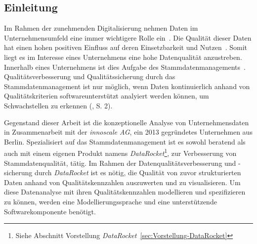\documentclass[
  language=german, %
  type=bachelor,%
  ngerman
]{isthesis}
\begin{document}
\begin{content}



  \chapter{Einleitung}


	Im Rahmen der zunehmenden Digitalisierung nehmen Daten im Unternehmensumfeld
	eine immer wichtigere Rolle ein~\cite[][]{otto2016datenqualitat}. Die
	Qualität dieser Daten hat einen hohen positiven Einfluss auf deren
	Einsetzbarkeit und Nutzen~\cite[][]{naumann2007datenqualitat,
	helfert2000massnahmen}. Somit liegt es im Interesse eines Unternehmens eine
	hohe Datenqualität anzustreben. Innerhalb eines Unternehmens ist dies Aufgabe
	des Stammdatenmanagements~\cite[][]{legner2007stammdaten}.
	Qualitätsverbesserung und Qualitätssicherung durch das Stammdatenmanagement
	ist nur möglich, wenn Daten kontinuierlich anhand von Qualitätskriterien
	softwareunterstützt analyiert werden können, um Schwachstellen zu erkennen
	(\cite{baghi2013controlling}, S. 2).

  Gegenstand dieser Arbeit ist die konzeptionelle Analyse von Unternehmensdaten
  in Zusammenarbeit mit der \textit{innoscale AG}, ein 2013 gegründetes
  Unternehmen aus Berlin.  Spezialisiert auf das Stammdatenmanagement ist es
  sowohl beratend als auch mit einem eigenen Produkt namens
  \textit{DataRocket}\footnote{Siehe Abschnitt Vorstellung
  \textit{DataRocket}~\ref{sec:Vorstellung-DataRocket}}, zur Verbesserung von
  Stammdatenqualität, tätig. Im Rahmen der Datenqualitätsverbesserung und
  -sicherung durch \textit{DataRocket} ist es nötig, die Qualität von zuvor
  strukturierten Daten anhand von Qualitätskennzahlen auszuwerten und zu
  visualisieren. Um diese Datenanalyse mit ihren Qualitätskennzahlen
  modellieren und spezifizieren zu können, werden eine Modellierungssprache und
  eine unterstützende Softwarekomponente benötigt.


\end{content}
\end{document}
